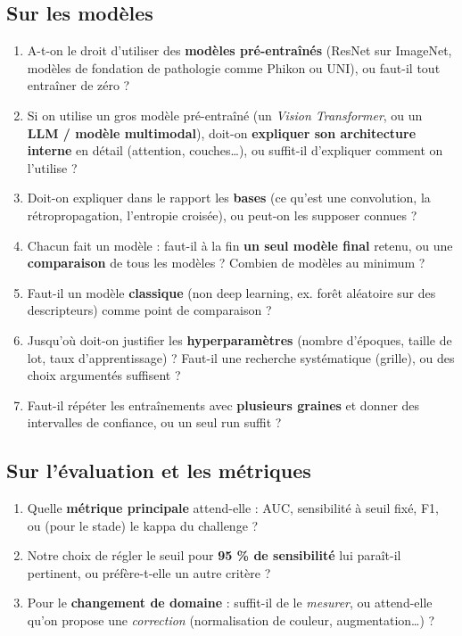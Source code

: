 \documentclass[11pt,a4paper]{article}
\begin{document}
\subsection*{Sur les modèles}
\begin{enumerate}[label=\textbf{Q\arabic*.},resume]
  \item A-t-on le droit d'utiliser des \textbf{modèles pré-entraînés} (ResNet sur ImageNet, modèles de
        fondation de pathologie comme Phikon ou UNI), ou faut-il tout entraîner de zéro ?
  \item Si on utilise un gros modèle pré-entraîné (un \emph{Vision Transformer}, ou un \textbf{LLM /
        modèle multimodal}), doit-on \textbf{expliquer son architecture interne} en détail (attention,
        couches…), ou suffit-il d'expliquer comment on l'utilise ?
  \item Doit-on expliquer dans le rapport les \textbf{bases} (ce qu'est une convolution, la rétropropagation,
        l'entropie croisée), ou peut-on les supposer connues ?
  \item Chacun fait un modèle : faut-il à la fin \textbf{un seul modèle final} retenu, ou une
        \textbf{comparaison} de tous les modèles ? Combien de modèles au minimum ?
  \item Faut-il un modèle \textbf{classique} (non deep learning, ex. forêt aléatoire sur des descripteurs)
        comme point de comparaison ?
  \item Jusqu'où doit-on justifier les \textbf{hyperparamètres} (nombre d'époques, taille de lot, taux
        d'apprentissage) ? Faut-il une recherche systématique (grille), ou des choix argumentés suffisent ?
  \item Faut-il répéter les entraînements avec \textbf{plusieurs graines} et donner des intervalles de
        confiance, ou un seul run suffit ?
\end{enumerate}

\subsection*{Sur l'évaluation et les métriques}
\begin{enumerate}[label=\textbf{Q\arabic*.},resume]
  \item Quelle \textbf{métrique principale} attend-elle : AUC, sensibilité à seuil fixé, F1, ou (pour le stade)
        le kappa du challenge ?
  \item Notre choix de régler le seuil pour \textbf{95 \% de sensibilité} lui paraît-il pertinent, ou
        préfère-t-elle un autre critère ?
  \item Pour le \textbf{changement de domaine} : suffit-il de le \emph{mesurer}, ou attend-elle qu'on
        propose une \emph{correction} (normalisation de couleur, augmentation…) ?
\end{enumerate}
\end{document}
